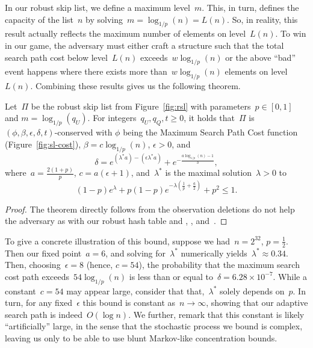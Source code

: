 In our robust skip list, we define a maximum level~$m$. This, in turn, defines the capacity of the list~$n$ by solving~$m = \log_{1/p}(n) = L(n)$. So, in reality, this result actually reflects the maximum number of elements on level~$L(n)$. To win in our game, the adversary must either craft a structure such that the total search path cost below level~$L(n)$ exceeds~$w \log_{1/p}(n)$ or the above ``bad'' event happens where there exists more than~$w \log_{1/p}(n)$ elements on level~$L(n)$. Combining these results gives us the following theorem.

\begin{theorem}\label{thm:rslsr}
    Let~$\Pi$ be the robust skip list from Figure~\ref{fig:rsl} with parameters~$p \in [0,1]$ and $m = \log_{1/p}(q_U)$. For integers~$q_U,q_Q,t \geq 0$, it holds that~$\Pi$ is~$(\phi,\beta,\epsilon,\delta,t)$-conserved with $\phi$ being the Maximum Search Path Cost function (Figure~\ref{fig:sl-cost}), $\beta = c \log_{1/p}(n)$, $\epsilon > 0 $, and 
    $$\delta = e^{(\lambda^{*}a) - (\epsilon\lambda^{*}a)} + e^{-\frac{a\log_{1/p}(n)-1}{3}},$$
    where~$a=\frac{2(1+p)}{p}$, $c = a(\epsilon + 1)$, and~$\lambda^{*}$ is the maximal solution~$\lambda > 0$ to
 $$(1-p)e^{\lambda} + p(1-p)e^{-\lambda \left(\frac{1}{p} + \frac{a}{2} \right)} + p^2 \leq 1 .$$
\end{theorem}

\begin{proof}
    The theorem directly follows from the observation deletions do not help the adversary as with our robust hash table and , , and~.
\end{proof}

To give a concrete illustration of this bound, suppose we had~$n = 2^{32}$, $p=\frac{1}{2}$. Then our fixed point~$a = 6$, and solving for~$\lambda^{*}$ numerically yields~$\lambda^{*} \approx 0.34$. Then, choosing~$\epsilon = 8$ (hence, $c=54$), the probability that the maximum search cost path exceeds~$54 \log_{1/p}(n)$ is less than or equal to~$\delta =  6.28 \times 10^{-7}$. While a constant~$c = 54$ may appear large, consider that that,~$\lambda^{*}$ solely depends on~$p$. In turn, for any fixed~$\epsilon$ this bound is constant as~$n\to\infty$, showing that our adaptive search path is indeed~$O(\log n)$. We further, remark that this constant is likely ``artificially'' large, in the sense that the stochastic process we bound is complex, leaving us only to be able to use blunt Markov-like concentration bounds.


